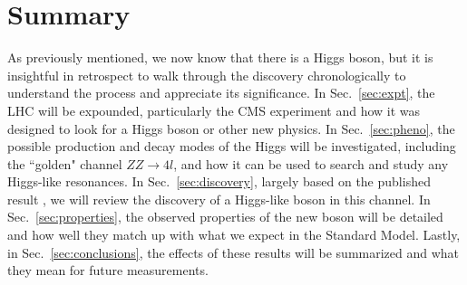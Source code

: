 \section{Summary}
\label{sec:intro_summary}

As previously mentioned, we now know that there is a Higgs boson, but it is insightful in retrospect to walk through the discovery chronologically to understand the process and appreciate its significance. In Sec.~\ref{sec:expt}, the LHC will be expounded, particularly the CMS experiment and how it was designed to look for a Higgs boson or other new physics. In Sec.~\ref{sec:pheno}, the possible production and decay modes of the Higgs will be investigated, including the ``golden" channel $ZZ\rightarrow 4l$, and how it can be used to search and study any Higgs-like resonances. In Sec.~\ref{sec:discovery}, largely based on the published result \cite{Higgs4lLegacy:2013}, we will review the discovery of a Higgs-like boson in this channel. In Sec.~\ref{sec:properties}, the observed properties of the new boson will be detailed and how well they match up with what we expect in the Standard Model. Lastly, in Sec.~\ref{sec:conclusions}, the effects of these results will be summarized and what they mean for future measurements.